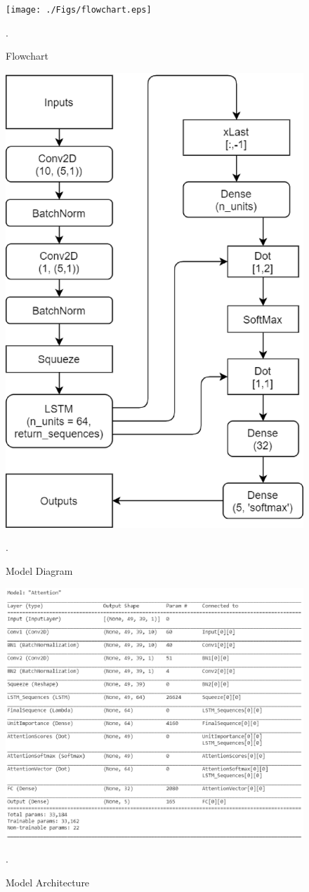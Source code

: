 \documentclass[11pt,english]{article}
\begin{document}
\begin{figure}[!ht]
\centering
\texttt{[image: ./Figs/flowchart.eps]}
\caption{Flowchart}.
\label{fig: Flow}	
\end{figure}
%
\begin{figure}[!ht]
\centering
\includegraphics[width=\columnwidth]{./Figs/model_diag.eps}
\caption{ Model Diagram}.
\label{fig: Model_diag}	
\end{figure}

\onecolumn

\begin{figure}[!ht]
    \centering
    \includegraphics[width=\columnwidth]{./Figs/model.eps}
    \caption{Model Architecture}.
    \label{fig: Model}	
    \end{figure}
\end{document}
